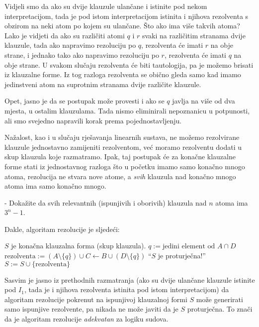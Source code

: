 Vidjeli smo da ako su dvije klauzule ulančane i istinite pod nekom interpretacijom, tada je pod istom interpretacijom istinita i njihova rezolventa s obzirom na neki atom po kojem su ulančane. Što ako ima više takvih atoma? Lako je vidjeti da ako su različiti atomi $q$ i $r$ svaki na različitim stranama dvije klauzule, tada ako napravimo rezoluciju po $q$, rezolventa će imati $r$ na obje strane, i jednako tako ako napravimo rezoluciju po $r$, rezolventa će imati $q$ na obje strane. U svakom slučaju rezolventa će biti tautologija, pa je možemo brisati iz klauzalne forme. Iz tog razloga rezolventa se obično gleda samo kad imamo jedinstveni atom na suprotnim stranama dvije različite klauzule.

Opet, jasno je da se postupak može provesti i ako se $q$ javlja na više od dva mjesta, u ostalim klauzulama. Tada nismo eliminirali nepoznanicu u potpunosti, ali smo svejedno napravili korak prema pojednostavljenju.

Nažalost, kao i u slučaju rješavanja linearnih sustava, ne možemo rezolvirane klauzule jednostavno zamijeniti rezolventom, već moramo rezolventu dodati u skup klauzula koje razmatramo. Ipak, taj postupak će za konačne klauzalne forme stati iz jednostavnog razloga što u početku imamo samo konačno mnogo atoma, rezolucija ne stvara nove atome, a \emph{svih} klauzula nad konačno mnogo atoma ima samo konačno mnogo.

\begin{zadatak}-
	Dokažite da svih relevantnih (ispunjivih i oborivih) klauzula nad $n$ atoma ima $3^n-1$.
\end{zadatak}

Dakle, algoritam rezolucije je sljedeći:

\begin{algorithmic}
	\Require $S$ je konačna klauzalna forma (skup klauzula).
			\State $q:=\mbox{jedini element od }A\cap D$
			\State $\mbox{rezolventa}:=(A\setminus\{q\})\cup C\leftarrow B\cup(D\setminus\{q\})$
				\Return \enquote{$S$ je proturječna!}
			\EndIf
			\State $S:=S\cup \{\mbox{rezolventa}\}$
		\EndIf
	\EndFor
\end{algorithmic}

Sasvim je jasno iz prethodnih razmatranja (ako su dvije ulančane klauzule istinite pod $I_1$, tada je i njihova rezolventa istinita pod istom interpretacijom) da algoritam rezolucije pokrenut na ispunjivoj klauzalnoj formi $S$ može generirati samo ispunjive rezolvente, pa nikada ne može javiti da je $S$ proturječna. To znači da je algoritam rezolucije \emph{adekvatan} za logiku sudova.


